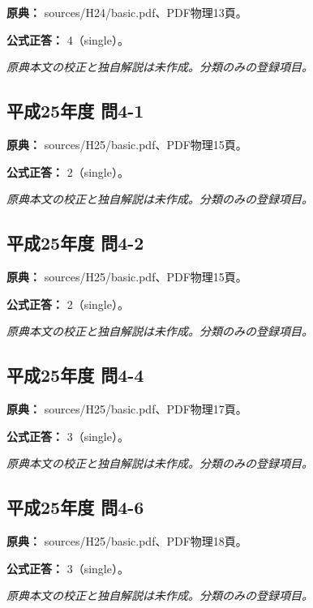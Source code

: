 \noindent\textbf{原典：} sources/H24/basic.pdf、PDF物理13頁。

\textbf{公式正答：} 4（single）。

\par\textit{原典本文の校正と独自解説は未作成。分類のみの登録項目。}

\subsection{平成25年度 問4-1}
\label{q:h25-reg-basic-4-1}

\noindent\textbf{原典：} sources/H25/basic.pdf、PDF物理15頁。

\textbf{公式正答：} 2（single）。

\par\textit{原典本文の校正と独自解説は未作成。分類のみの登録項目。}

\subsection{平成25年度 問4-2}
\label{q:h25-reg-basic-4-2}

\noindent\textbf{原典：} sources/H25/basic.pdf、PDF物理15頁。

\textbf{公式正答：} 2（single）。

\par\textit{原典本文の校正と独自解説は未作成。分類のみの登録項目。}

\subsection{平成25年度 問4-4}
\label{q:h25-reg-basic-4-4}

\noindent\textbf{原典：} sources/H25/basic.pdf、PDF物理17頁。

\textbf{公式正答：} 3（single）。

\par\textit{原典本文の校正と独自解説は未作成。分類のみの登録項目。}

\subsection{平成25年度 問4-6}
\label{q:h25-reg-basic-4-6}

\noindent\textbf{原典：} sources/H25/basic.pdf、PDF物理18頁。

\textbf{公式正答：} 3（single）。

\par\textit{原典本文の校正と独自解説は未作成。分類のみの登録項目。}

